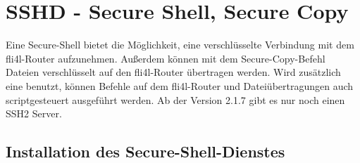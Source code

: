 \section {SSHD - Secure Shell, Secure Copy}

Eine Secure-Shell bietet die Möglichkeit, eine verschlüsselte Verbindung mit
dem fli4l-Router aufzunehmen. Außerdem können mit dem Secure-Copy-Befehl
Dateien verschlüsselt auf den fli4l-Router übertragen werden. Wird zusätzlich
eine  benutzt, können Befehle auf
dem fli4l-Router und Dateiübertragungen auch scriptgesteuert ausgeführt
werden. Ab der Version 2.1.7 gibt es nur noch einen SSH2 Server.

\subsection {Installation des Secure-Shell-Dienstes}

